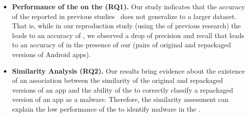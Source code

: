 \begin{itemize}
\item \textbf{Performance of the \mas on the \cds (RQ1).} 
  Our study indicates that the accuracy of the \mas reported in
  previous studies~\cite{DBLP:conf/wcre/BaoLL18,DBLP:journals/jss/CostaMMSSBNR22} does not
  generalize to a larger dataset. That is, while in our
  reproduction study (using the \sds of previous research) the \mas
  leads to an accuracy of \fscoreSmall, we observed a drop of precision and recall
  that leads to an accuracy of \fscore in the presence of our \cds (\apps pairs of
  original and repackaged versions of Android apps). 


\item \textbf{Similarity Analysis (RQ2).} Our results bring evidence about the existence of an association between the similarity of the original and repackaged versions of an app and the ability of the \mas to correctly classify a repackaged version of an app as a malware. Therefore, the similarity assessment can explain the low performance of the \mas to identify malware in the \cds.



\end{itemize}



